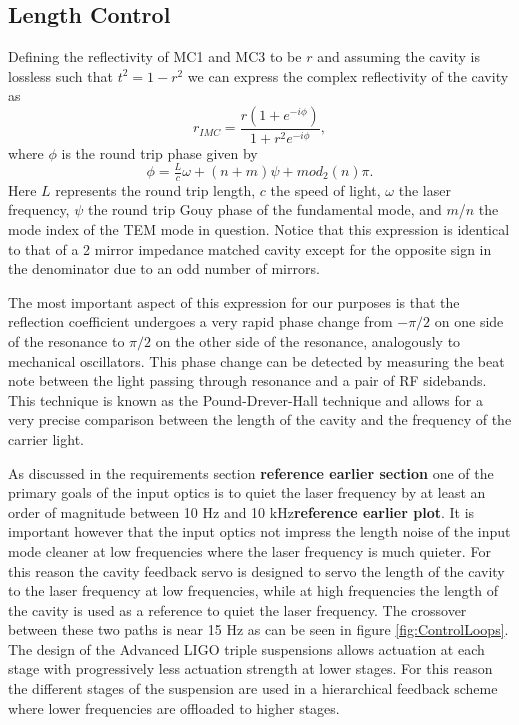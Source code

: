 \subsection{Length Control}
Defining the reflectivity of MC1 and MC3 to be $r$ and assuming the cavity is lossless such that 
$t^2 = 1-r^2$ we can express the complex reflectivity of the cavity as 
\begin{equation}
	r_{IMC} = \frac{r(1+e^{-i\phi})}{1+r^2e^{-i\phi}},
\end{equation}
where $\phi$ is the round trip phase given by 
\begin{equation}
	\phi=\tfrac{L}{c}\omega+(n+m)\psi+mod_2(n)\pi.
	\label{eq:phi}
\end{equation}	
Here $L$ represents the round trip length, $c$ the speed of light, $\omega$ the laser frequency, 
$\psi$ the round trip Gouy phase of the fundamental mode, and $m$/$n$ the mode index of the 
TEM mode in question.  
Notice that this expression is identical to that of a 2 mirror impedance matched cavity except 
for the opposite sign in the denominator due to an odd number of mirrors.  

The most important aspect of this expression for our purposes is that the reflection coefficient 
undergoes a very rapid phase change from $-\pi/2$ on one side of the resonance to $\pi/2$ 
on the other side of the resonance, analogously to mechanical oscillators.  
This phase change can be detected by measuring the beat note between the light passing 
through resonance and a pair of RF sidebands.  
This technique is known as the Pound-Drever-Hall technique\cite{black_introduction_2001}\cite{drever_laser_1983} 
and allows for a very precise comparison between the length of the cavity and the frequency 
of the carrier light.  

As discussed in the requirements section \textbf{reference earlier section} one of the primary 
goals of the input optics is to quiet the laser frequency by at least an order of magnitude 
between 10 Hz and 10 kHz\textbf{reference earlier plot}.  
It is important however that the input optics not impress the length noise of the input mode 
cleaner at low frequencies where the laser frequency is much quieter.  
For this reason the cavity feedback servo is designed to servo the length of the 
cavity to the laser frequency at low frequencies, while at high frequencies the 
length of the cavity is used as a reference to quiet the laser frequency.  
The crossover between these two paths is near 15 Hz as can be seen in figure 
\ref{fig:ControlLoops}.  
The design of the Advanced LIGO triple suspensions allows actuation at each stage 
with progressively less actuation strength at lower stages.  
For this reason the different stages of the suspension are used in a hierarchical 
feedback scheme where lower frequencies are offloaded to higher stages.  

